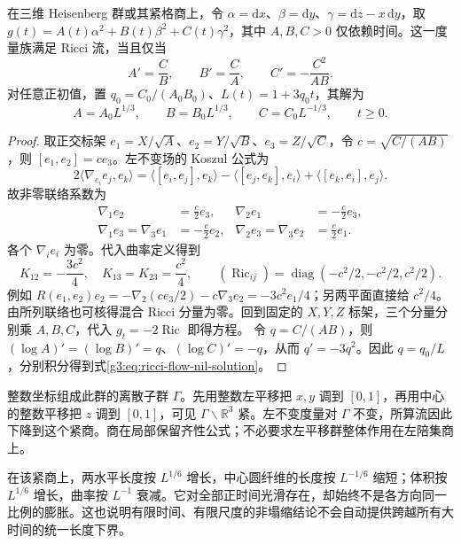 \begin{proposition}\label{g3:prop:ricci-flow-nil-model}
	在三维 Heisenberg 群或其紧格商上，令 \(\alpha=\mathrm dx\)、\(\beta=\mathrm dy\)、\(\gamma=\mathrm dz-x\,\mathrm dy\)，取 \(g(t)=A(t)\alpha^2+B(t)\beta^2+C(t)\gamma^2\)，其中 \(A,B,C>0\) 仅依赖时间。这一度量族满足 Ricci 流，当且仅当
	\begin{equation}\label{g3:eq:ricci-flow-nil-ode}
		A'=\frac CB,\qquad B'=\frac CA,\qquad
		C'=-\frac{C^2}{AB}.
	\end{equation}
	对任意正初值，置 \(q_0=C_0/(A_0B_0)\)、\(L(t)=1+3q_0t\)，其解为
	\begin{equation}\label{g3:eq:ricci-flow-nil-solution}
		A=A_0L^{1/3},\qquad B=B_0L^{1/3},\qquad
		C=C_0L^{-1/3},\qquad t\ge0.
	\end{equation}
\end{proposition}
\begin{proof}
	取正交标架 \(e_1=X/\sqrt A\)、\(e_2=Y/\sqrt B\)、\(e_3=Z/\sqrt C\)，令 \(c=\sqrt{C/(AB)}\)，则 \([e_1,e_2]=ce_3\)。左不变场的 Koszul 公式为
	\[
		2\langle\nabla_{e_i}e_j,e_k\rangle
		=\langle[e_i,e_j],e_k\rangle
		-\langle[e_j,e_k],e_i\rangle+\langle[e_k,e_i],e_j\rangle.
	\]
	故非零联络系数为
	\[
	\begin{aligned}
		\nabla_1e_2&=\tfrac c2e_3,&\nabla_2e_1&=-\tfrac c2e_3,\\
		\nabla_1e_3=\nabla_3e_1&=-\tfrac c2e_2,&
		\nabla_2e_3=\nabla_3e_2&=\tfrac c2e_1.
	\end{aligned}
	\]
	各个 \(\nabla_ie_i\) 为零。代入曲率定义得到
	\[
		K_{12}=-\frac{3c^2}{4},\quad K_{13}=K_{23}=\frac{c^2}{4},
		\qquad (\operatorname{Ric}_{ij})=
		\operatorname{diag}(-c^2/2,-c^2/2,c^2/2).
	\]
	例如 \(R(e_1,e_2)e_2=-\nabla_2(c e_3/2)-c\nabla_3e_2=-3c^2e_1/4\)；另两平面直接给 \(c^2/4\)。由所列联络也可核得混合 Ricci 分量为零。回到固定的 \(X,Y,Z\) 标架，三个分量分别乘 \(A,B,C\)，代入 \(g_t=-2\operatorname{Ric}\) 即得方程。
	令 \(q=C/(AB)\)，则 \((\log A)'=(\log B)'=q\)、\((\log C)'=-q\)，从而 \(q'=-3q^2\)。因此 \(q=q_0/L\)，分别积分得到式\eqref{g3:eq:ricci-flow-nil-solution}。
\end{proof}

整数坐标组成此群的离散子群 \(\Gamma\)。先用整数左平移把 \(x,y\) 调到 \([0,1]\)，再用中心的整数平移把 \(z\) 调到 \([0,1]\)，可见 \(\Gamma\backslash\mathbb R^3\) 紧。左不变度量对 \(\Gamma\) 不变，所算流因此下降到这个紧商。商在局部保留齐性公式；不必要求左平移群整体作用在左陪集商上。

\ProseParagraphBreak
在该紧商上，两水平长度按 \(L^{1/6}\) 增长，中心圆纤维的长度按 \(L^{-1/6}\) 缩短；体积按 \(L^{1/6}\) 增长，曲率按 \(L^{-1}\) 衰减。它对全部正时间光滑存在，却始终不是各方向同一比例的膨胀。这也说明有限时间、有限尺度的非塌缩结论不会自动提供跨越所有大时间的统一长度下界。

